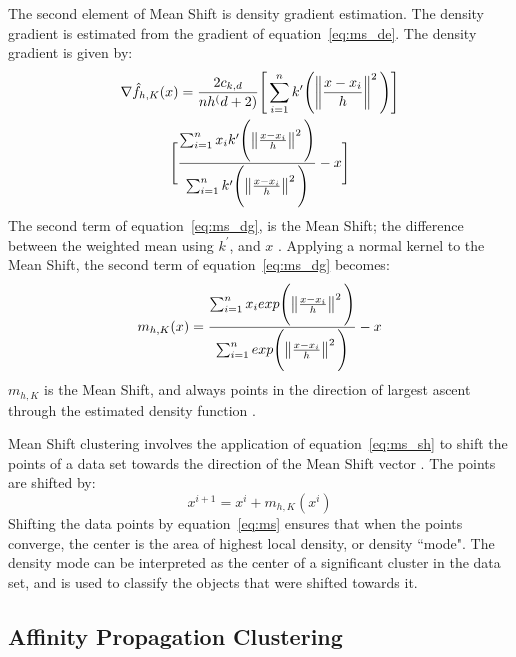 The second element of Mean Shift is density gradient estimation. 
The density gradient is estimated from the gradient of equation~\ref{eq:ms_de}\citet{vatturi09}.
The density gradient is given by: 
\begin{multline}
\label{eq:ms_dg}
\nabla\hat{f}_{h,K}(x) = \frac{2c_{k,d}}{nh^(d+2)} \Bigg[ \sum_{i=1}^n k^{\prime} \Bigg( \norm{\frac{x-x_{i}}{h}}^2 \Bigg) \Bigg] \\ \Bigg[\frac{\sum_{i=1}^n x_{i}k^{\prime} \Bigg( \norm{\frac{x-x_{i}}{h}}^2 \Bigg)}{\sum_{i=1}^n k^{\prime} \Bigg( \norm{\frac{x-x_{i}}{h}}^2 \Bigg)} - x \Bigg]
\end{multline}
The second term of equation~\ref{eq:ms_dg}, is the Mean Shift; the difference between the weighted mean using $k^{\prime}$, and $x$ \citet{vatturi09}.
Applying a normal kernel to the Mean Shift, the second term of equation~\ref{eq:ms_dg} becomes: 
\begin{equation} 
\label{eq:ms_sh}
m_{h,K}(x) = \frac{\sum_{i=1}^n x_{i} exp \Bigg(\norm{\frac{x-x_{i}}{h}}^2 \Bigg)}{\sum_{i=1}^n exp \Bigg(\norm{\frac{x-x_{i}}{h}}^2 \Bigg)} - x
\end{equation}
$m_{h,K}$ is the Mean Shift, and always points in the direction of largest ascent through the estimated density function \citet{vatturi09}.

Mean Shift clustering involves the application of equation~\ref{eq:ms_sh} to shift the points of a data set towards the direction of the Mean Shift vector \citet{vatturi09}. 
The points are shifted by: 
\begin{equation}
\label{eq:ms}
x^{i+1} = x^i + m_{h,K}(x^i)
\end{equation}
Shifting the data points by equation~\ref{eq:ms} ensures that when the points converge, the center is the area of highest local density, or density ``mode". 
The density mode can be interpreted as the center of a significant cluster in the data set, and is used to classify the objects that were shifted towards it.

\subsection{Affinity Propagation Clustering}\label{sec:methods_ap}

